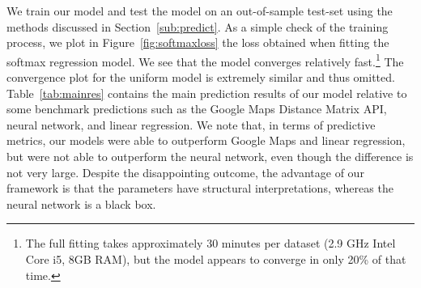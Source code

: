 \documentclass{article}
\begin{document}
We train our model and test the model on an out-of-sample test-set using the methods discussed in Section~\ref{sub:predict}. As a simple check of the training process, we plot in Figure~\ref{fig:softmaxloss} the loss obtained when fitting the softmax regression model. We see that the model converges relatively fast.\footnote{The full fitting takes approximately 30 minutes per dataset (2.9 GHz Intel Core i5, 8GB RAM), but the model appears to converge in only 20\% of that time.} The convergence plot for the uniform model is extremely similar and thus omitted. Table~\ref{tab:mainres} contains the main prediction results of our model relative to some benchmark predictions
such as the Google Maps Distance Matrix API, neural network, and linear regression. We note that, in terms of predictive metrics, our models were able to outperform Google Maps and linear regression, but were not able to outperform the neural network, even though the difference is not very large. Despite the disappointing outcome, the advantage of our framework is that the parameters have structural interpretations, whereas the neural network is a black box. 
\end{document}
